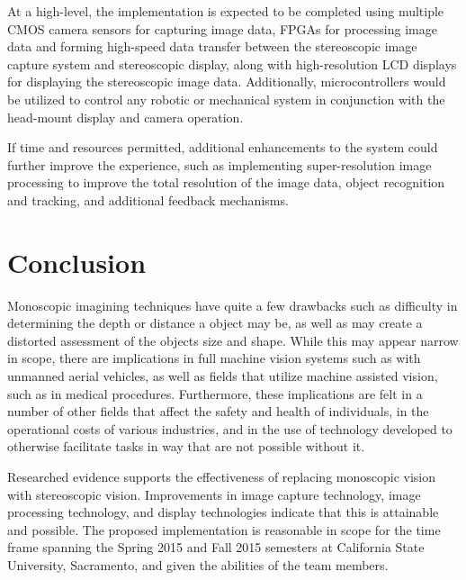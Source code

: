 \documentclass[12pt, journal]{IEEEtran}
\begin{document}
At a high-level, the implementation is expected to be completed using multiple CMOS camera sensors for capturing image data, FPGAs for processing image data and forming high-speed data transfer between the stereoscopic image capture system and stereoscopic display, along with high-resolution LCD displays for displaying the stereoscopic image data.  Additionally, microcontrollers would be utilized to control any robotic or mechanical system in conjunction with the head-mount display and camera operation.

If time and resources permitted, additional enhancements to the system could further improve the experience, such as implementing super-resolution image processing to improve the total resolution of the image data, object recognition and tracking, and additional feedback mechanisms.  

\section{Conclusion}
Monoscopic imagining techniques have quite a few drawbacks such as difficulty in determining the depth or distance a object may be, as well as may create a distorted assessment of the objects size and shape. While this may appear narrow in scope, there are implications in full machine vision systems such as with unmanned aerial vehicles, as well as fields that utilize machine assisted vision, such as in medical procedures.  Furthermore, these implications are felt in a number of other fields that affect the safety and health of individuals, in the operational costs of various industries, and in the use of technology developed to otherwise facilitate tasks in way that are not possible without it.

Researched evidence supports the effectiveness of replacing monoscopic vision with stereoscopic vision.  Improvements in image capture technology, image processing technology, and display technologies indicate that this is attainable and possible.  The proposed implementation is reasonable in scope for the time frame spanning the Spring 2015 and Fall 2015 semesters at California State University, Sacramento, and given the abilities of the team members.


\end{document}
